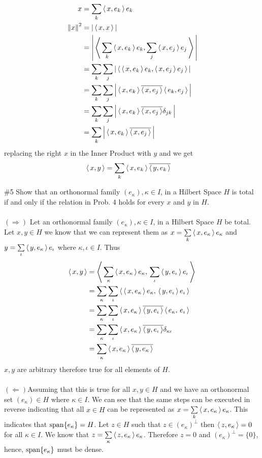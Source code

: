 \documentclass[10pt,a4paper]{report}
\newcommand{\NORM}[1]{\,\left \Vert #1 \right \Vert}
\begin{document}
\begin{align*}
	x &= \sum_k \ABRACKET{x, e_k}e_k\\
	\NORM{x}^2 &= \BARS{ \ABRACKET{x,x} }\\
	&= \BARS{ \ABRACKET{\sum_k \ABRACKET{x, e_k}e_k,\sum_j \ABRACKET{x, e_j}e_j} } \\
	&= \sum_k \sum_j \BARS{\ABRACKET{\ABRACKET{x, e_k}e_k, \ABRACKET{x, e_j}e_j}}\\
	&= \sum_k \sum_j \BARS{\ABRACKET{x, e_k}\CONJ{\ABRACKET{x, e_j}}\ABRACKET{e_k,e_j}}\\
	&= \sum_k \sum_j \BARS{\ABRACKET{x, e_k}\CONJ{\ABRACKET{x, e_j}}\delta_{jk}}\\
	 &= \sum_k \BARS{\ABRACKET{x, e_k}\CONJ{\ABRACKET{x, e_j}}}
\end{align*}replacing the right $x$ in the Inner Product with $y$ and we get
\begin{align*}
	\left \langle\, x,y \,\right \rangle &= \sum_k \left \langle\, x,e_k \,\right \rangle\overline{\left \langle\, y,e_k \,\right \rangle}
\end{align*}


\noindent \#5 Show that an orthonormal family $(e_\kappa), \kappa \in I$, in a Hilbert Space $H$ is total if and only if the relation in Prob. 4 holds for every $x$ and $y$ in $H$. \\
\\
$(\Rightarrow)$ Let an orthonormal family $(e_\kappa), \kappa \in I$, in a Hilbert Space $H$ be total.  Let $x,y \in H$ we know that we can represent them as $x = \underset{k}{\overset{}{\sum}} \left \langle\, x, e_\kappa \,\right \rangle e_\kappa$ and $y = \underset{\iota}{\overset{}{\sum}} \left \langle\, y, e_\kappa \,\right \rangle e_\iota$ where $\kappa, \iota \in I$.  Thus 
\begin{align*}
	\left \langle\, x,y \,\right \rangle &= \left \langle\, \sum_\kappa \left \langle\, x, e_\kappa \,\right \rangle e_\kappa,\, \sum_{\iota} \left \langle\, y, e_\iota \,\right \rangle e_\iota \,\right \rangle \\
	&= \sum_\kappa \sum_\iota \left \langle\,  \left \langle\, x, e_\kappa \,\right \rangle e_\kappa,\, \left \langle\, y, e_\iota \,\right \rangle e_\iota \,\right \rangle \\
	&= \sum_\kappa \sum_\iota \left \langle\, x, e_\kappa \,\right \rangle\overline{\left \langle\, y, e_\iota \,\right \rangle}\left \langle\,  e_\kappa,\, e_\iota \,\right \rangle \\
	&= \sum_\kappa \sum_\iota \left \langle\, x, e_\kappa \,\right \rangle\overline{\left \langle\, y, e_\iota \,\right \rangle}\delta_{\kappa\iota} \\
	&= \sum_\kappa \left \langle\, x, e_\kappa \,\right \rangle\overline{\left \langle\, y, e_\kappa \,\right \rangle}
\end{align*}$x,y$ are arbitrary therefore true for all elements of $H$.\\
\\
$(\Leftarrow)$Assuming that this is true for all $x,y \in H$ and we have an orthonormal set $(e_\kappa) \in H$ where $\kappa \in I$.  We can see that the same steps can be executed in reverse indicating that all $x \in H$ can be represented as $x = \underset{k}{\overset{}{\sum}} \left \langle\, x, e_\kappa \,\right \rangle e_\kappa$.  This indicates that $\operatorname{span}\{e_\kappa\} = H$.  Let $z \in H$ such that $z \in (e_\kappa)^\perp$ then $\left \langle\, z, e_\kappa \,\right \rangle = 0$ for all $\kappa \in I$.  We know that $z = \underset{\kappa}{\overset{}{\sum}} \left \langle\, z,e_\kappa \,\right \rangle e_\kappa$. Therefore $z = 0$ and $(e_\kappa)^\perp = \{0\}$, hence, $\operatorname{span}\{e_\kappa\}$ must be dense.\\
\end{document}
